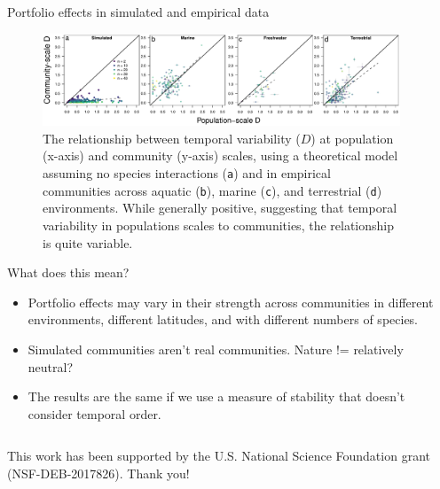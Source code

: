 \documentclass[final,hyperref={pdfpagelabels=false}]{beamer}
\begin{document}
\begin{frame}[t]
\begin{columns}[t]
\begin{column}{0.46\textwidth}
	\begin{block}{Portfolio effects in simulated and empirical data}

		\begin{figure}
			\includegraphics[width=\linewidth]{figures/dSpStudy.pdf}
			\caption{The relationship between temporal variability ($D$) at population (x-axis) and community (y-axis) scales, using a theoretical model assuming no species interactions (\texttt{a}) and in empirical communities across aquatic (\texttt{b}), marine (\texttt{c}), and terrestrial (\texttt{d}) environments. While generally positive, suggesting that temporal variability in populations scales to communities, the relationship is quite variable.}
		\end{figure}

	\end{block}



\begin{exampleblock}{What does this mean?}

\begin{itemize}
  \item Portfolio effects may vary in their strength across communities in different environments, different latitudes, and with different numbers of species. 
  \item Simulated communities aren't real communities. Nature != relatively neutral? 
  \item The results are the same if we use a measure of stability that doesn't consider temporal order.
\end{itemize}
\end{exampleblock}


\end{column} 


\begin{column}{0.02\textwidth}\end{column} %
\end{columns} 


{\Huge \faThumbsOUp} This work has been supported by the U.S. National Science Foundation grant (NSF-DEB-2017826). \textcolor{recRed}{Thank you!}  

\end{frame} 
\end{document}
